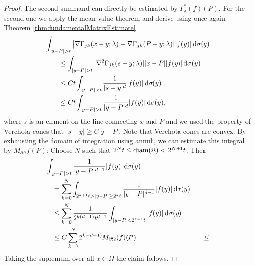 \begin{proof}
  The second summand can directly be estimated by $T_\lambda^*(f)(P)$.
  For the second one we apply the mean value theorem and derive using once again Theorem \ref{thm:fundamentalMatrixEstimate}
  \begin{align*}
    &\int_{|y - P| > t} \big| \nabla\Gamma_{jk}(x - y; \lambda) - \nabla\Gamma_{jk}(P - y; \lambda) \big| |f(y)| \, {\operatorname{d}\!{\sigma}}(y) \\ 
    &\qquad\leq \int_{|y - P| > t} |\nabla^2 \Gamma_{jk}(s - y; \lambda)| |x - P| |f(y) | \, {\operatorname{d}\!{\sigma}}(y) \\
    &\qquad\leq C t \int_{|y - P| > t} \frac{1}{|s - y|^{d}} |f(y)| \, {\operatorname{d}\!{\sigma}}(y) \\
    &\qquad\leq C t \int_{|y - P| > t} \frac{1}{|y - P|^{d}} |f(y)| \, {\operatorname{d}\!{\sigma}}(y) ,
  \end{align*}
  where $s$ is an element on the line connecting $x$ and $P$ and we used the property of Verchota-cones that $|s - y| \geq C |y - P|$.
  Note that Verchota cones are convex.
  By exhausting the domain of integration using annuli, we can estimate this integral by $M_{\partial\Omega}f(P)$:
  Choose $N$ such that $2^N t \leq \operatorname{diam}(\Omega) < 2^{N + 1}t$.
  Then
  \begin{align*}
    &\int_{|y - P| > t} \frac{1}{|y - P|^{d - 1}} |f(y)| \, {\operatorname{d}\!{\sigma}}(y) \\
    &\quad= \sum_{k = 0}^N \int_{2^{k + 1}t > |y - P| \geq 2^k t} \frac{1}{|y - P|^{d - 1}} |f(y)| \, {\operatorname{d}\!{\sigma}}(y) \\
    &\quad\leq \sum_{k = 0}^N \frac{1}{2^{k(d - 1)} t^{d - 1}} \int_{|y - P| < 2^{k + 1} t} |f(y)| \, {\operatorname{d}\!{\sigma}}(y) \\
    &\quad \leq  C \sum_{k = 0}^N 2^{k - d + 1)} M_{\partial\Omega}(f)(P)
    &\quad\leq
  \end{align*}
  Taking the supremum over all $x \in \Omega$ the claim follows.


\end{proof}
